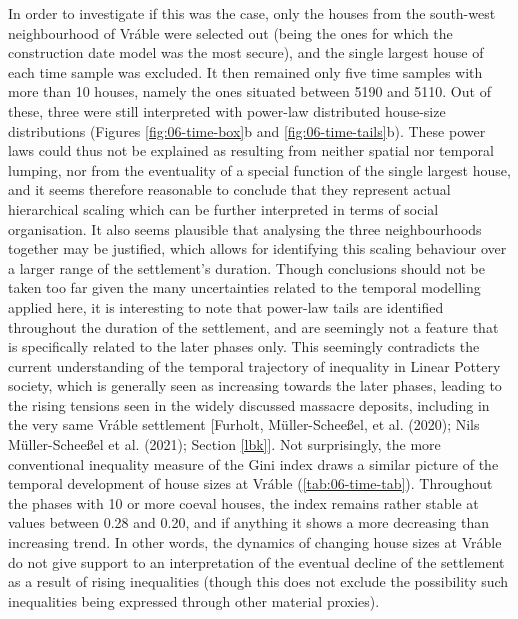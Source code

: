 \documentclass[
  12pt,
  a4paper, twoside]{book}
\begin{document}
In order to investigate if this was the case, only the houses from the south-west neighbourhood of Vráble were selected out (being the ones for which the construction date model was the most secure), and the single largest house of each time sample was excluded. It then remained only five time samples with more than 10 houses, namely the ones situated between 5190 and 5110. Out of these, three were still interpreted with power-law distributed house-size distributions (Figures \ref{fig:06-time-box}b and \ref{fig:06-time-tails}b). These power laws could thus not be explained as resulting from neither spatial nor temporal lumping, nor from the eventuality of a special function of the single largest house, and it seems therefore reasonable to conclude that they represent actual hierarchical scaling which can be further interpreted in terms of social organisation. It also seems plausible that analysing the three neighbourhoods together may be justified, which allows for identifying this scaling behaviour over a larger range of the settlement's duration. Though conclusions should not be taken too far given the many uncertainties related to the temporal modelling applied here, it is interesting to note that power-law tails are identified throughout the duration of the settlement, and are seemingly not a feature that is specifically related to the later phases only. This seemingly contradicts the current understanding of the temporal trajectory of inequality in Linear Pottery society, which is generally seen as increasing towards the later phases, leading to the rising tensions seen in the widely discussed massacre deposits, including in the very same Vráble settlement {[}Furholt, Müller-Scheeßel, et al. (2020); Nils Müller-Scheeßel et al. (2021); Section \ref{lbk}{]}. Not surprisingly, the more conventional inequality measure of the Gini index draws a similar picture of the temporal development of house sizes at Vráble (\ref{tab:06-time-tab}). Throughout the phases with 10 or more coeval houses, the index remains rather stable at values between 0.28 and 0.20, and if anything it shows a more decreasing than increasing trend. In other words, the dynamics of changing house sizes at Vráble do not give support to an interpretation of the eventual decline of the settlement as a result of rising inequalities (though this does not exclude the possibility such inequalities being expressed through other material proxies).
\end{document}
